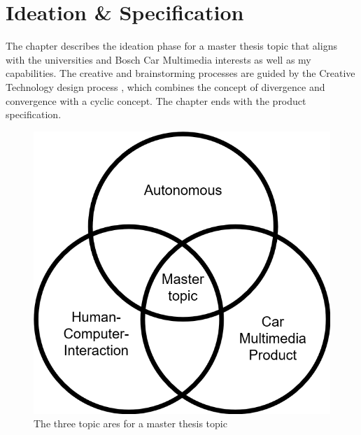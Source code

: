 \chapter{Ideation \& Specification}
\label{ch:ideation}
The chapter describes the ideation phase for a master thesis topic that aligns with the universities and Bosch Car Multimedia interests as well as my capabilities. The creative and brainstorming processes are guided by the Creative Technology design process \cite{Mader2014ATechnology}, which combines the concept of divergence and convergence with a cyclic concept. The chapter ends with the product specification.

\begin{figure}
    \includegraphics[height=0.4\textwidth]{fig/MasterTopic.png}
    \caption[Workshop]{The three topic ares for a master thesis topic}
    \label{fig:mastertopic}
\end{figure}

